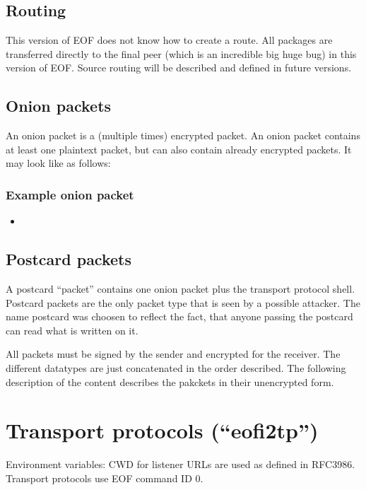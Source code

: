 \documentclass[12pt,a4paper]{book}
\begin{document}
\subsection{Routing}
This version of EOF does not know how to create a route.
All packages are transferred directly to the final peer (which is an
incredible big huge bug) in this version of EOF. Source routing will be
described and defined in future versions.
\subsection{Onion packets}
An onion packet is a (multiple times) encrypted packet.
An onion packet contains at least one plaintext packet, but can also contain
already encrypted packets. It may look like as follows:
\subsubsection{Example onion packet}
\begin{itemize}
\item 
\end{itemize}
\subsection{Postcard packets}
A postcard "`packet"' contains one onion packet plus the transport protocol
shell.  Postcard packets are the only packet type that is seen by a possible
attacker.  The name postcard was choosen to reflect the fact, that anyone
passing the postcard can read what is written on it.

All packets must be signed by the sender and encrypted for the receiver.
The different datatypes are just concatenated in the order described.
The following description of the content describes the pakckets
in their unencrypted form.

\section{Transport protocols ("`eofi2tp"')}
\label{tp}
Environment variables: CWD for listener
URLs are used as defined in RFC3986\cite{uri-1}.
Transport protocols use EOF command ID 0.
\end{document}
